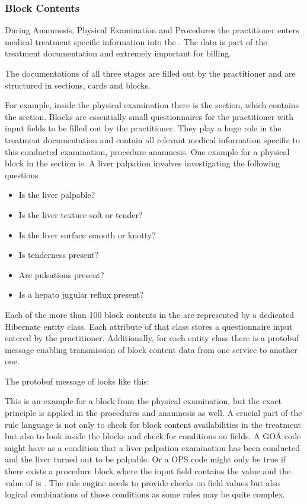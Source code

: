 \subsubsection{Block Contents}
During Anamnesis,
Physical Examination and Procedures the practitioner enters medical treatment specific information into the \AVS.
The data is part of the treatment documentation and extremely important for billing.

The documentations of all three stages are filled out by the practitioner and are structured in sections,
cards and blocks.

For example, inside the physical examination there is the section,
which contains the  section.
Blocks are essentially small questionnaires for the practitioner with input fields to be filled out by the practitioner.
They play a huge role in the treatment documentation
and contain all relevant medical information specific to this conducted examination,
procedure anamnesis.
One example for a physical block in the section is.
A liver palpation involves investigating the following questions

\begin{itemize}
    \item Is the liver palpable?
    \item Is the liver texture soft or tender?
    \item Is the liver surface smooth or knotty?
    \item Is tenderness present?
    \item Are pulsations present?
    \item Is a hepato jugular reflux present?
\end{itemize}

Each of the more than 100 block contents in the \AVS are represented by a dedicated Hibernate entity class.
Each attribute of that class stores a questionnaire input entered by the practitioner.
Additionally,
for each entity class there is a protobuf message
enabling transmission of block content data from one service to another one.

The protobuf message of  looks like this:




This is an example for a block from the physical examination,
but the exact principle is applied in the procedures and anamnesis as well.
A crucial part of the rule language is not only to check for block content availabilities in the treatment
but also to look inside the blocks and check for conditions on fields.
A GOÄ code might have as a condition that a liver palpation examination has been conducted
and the liver turned out to be palpable.
Or a OPS code might only be true
if there exists a procedure block 
where the input field  contains the value  and the value of  is .
The rule engine needs
to provide checks on field values but also logical combinations of those conditions as some rules may be quite complex.

